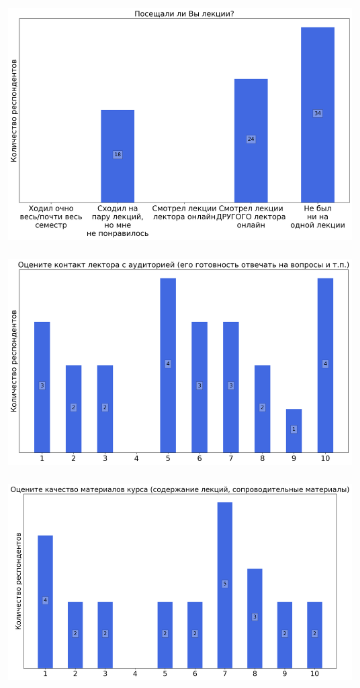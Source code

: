             \begin{figure}[H]
                \centering
                \begin{subfigure}[b]{0.45\textwidth}
                    \centering
                    \includegraphics[width=\textwidth]{images/3 course/Общая физика - квантовая физика/lecturer-questions-Кобякин А.С.-0.png}
                \end{subfigure}
                \begin{subfigure}[b]{0.45\textwidth}
                    \centering
                    \includegraphics[width=\textwidth]{images/3 course/Общая физика - квантовая физика/lecturer-marks-Кобякин А.С.-0.png}
                \end{subfigure}
                \begin{subfigure}[b]{0.45\textwidth}
                    \centering
                    \includegraphics[width=\textwidth]{images/3 course/Общая физика - квантовая физика/lecturer-marks-Кобякин А.С.-1.png}

\end{subfigure}
\end{figure}
